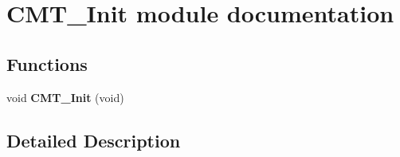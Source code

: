 \hypertarget{group___c_m_t___init__module}{}\section{C\+M\+T\+\_\+\+Init module documentation}
\label{group___c_m_t___init__module}
\subsection*{Functions}
\begin{DoxyCompactItemize}
\item 
void {\bfseries C\+M\+T\+\_\+\+Init} (void)\hypertarget{group___c_m_t___init__module_gab146794131db963adb86df2863a699b4}{}\label{group___c_m_t___init__module_gab146794131db963adb86df2863a699b4}

\end{DoxyCompactItemize}


\subsection{Detailed Description}
